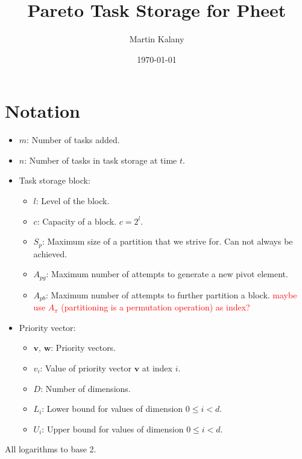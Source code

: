 \documentclass[a4paper,12pt]{article}
\newcommand\todo[1]{\textcolor{red}{#1}}
\newcommand\pv[1]{\mathbf{#1}}
\newcommand\pdim{D}
\newcommand\Li{L_{i}}
\newcommand\Ui{U_{i}}
\newcommand\mps{S_p}
\newcommand\apg{A_{pg}}
\newcommand\apb{A_{pb}}
\newcommand\lvl{l}
\newcommand\capacity{c}
\begin{document}
\title{Pareto Task Storage for Pheet}
\author{
Martin Kalany
}
\date{\today}

\maketitle

\section{Notation}\label{sec:notation}
\begin{itemize}
\item $m$: Number of tasks added.
\item $n$: Number of tasks in task storage at time $t$.
\item Task storage block:
	\begin{itemize}
	\item $\lvl$: Level of the block.
	\item $\capacity$: Capacity of a block. $c=2^\lvl$.
	\item $\mps$: Maximum size of a partition that we strive for. Can not always be achieved.
	\item $\apg$: Maximum number of attempts to generate a new pivot element.
	\item $\apb$: Maximum number of attempts to further partition a block. \todo{maybe use $A_\pi$ (partitioning is a permutation operation) as index?}
	\end{itemize}
\item Priority vector:
	\begin{itemize}
	\item $\pv{v}$, $\pv{w}$: Priority vectors.
	\item $v_i$: Value of priority vector $\pv{v}$ at index $i$.
	\item $\pdim$: Number of dimensions.
	\item $\Li$: Lower bound for values of dimension $0 \leq i < d$.
	\item $\Ui$: Upper bound for values of dimension $0 \leq i < d$.	
	\end{itemize}
\end{itemize}

All logarithms to base 2.
\end{document}
